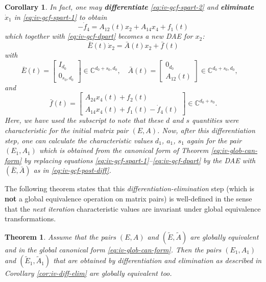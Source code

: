\documentclass[]{book}
\newtheorem{theorem}{Theorem}[chapter]
\newtheorem{corollary}{Corollary}[chapter]
\theoremstyle{definition}
\theoremstyle{definition}
\theoremstyle{definition}
\theoremstyle{definition}
\theoremstyle{remark}
\begin{document}
\begin{corollary}
\protect\hypertarget{cor:iv-diff-elim}{}{\label{cor:iv-diff-elim} }In fact, one may \textbf{differentiate} \eqref{eq:iv-gcf-spart-2} and \textbf{eliminate} \(\dot x_1\) in \eqref{eq:iv-gcf-spart-1} to obtain
\[
-\dot f_4 = A_{12}(t)x_2 + A_{14}x_4 + f_1(t)
\]
which together with \eqref{eq:iv-gcf-dpart} becomes a new DAE for \(x_2\):
\[
\bar E(t) \dot x_2 = \bar A(t) x_2 + \bar f(t)
\]
with
\begin{equation}
\bar E(t) = 
\begin{bmatrix}
I_{d_0} \\ 0_{s_0, d_0} 
\end{bmatrix}\in \mathbb C^{d_0+s_0, d_0}, \quad
\bar A(t) =
\begin{bmatrix}
0_{d_0} \\ A_{12}(t)
\end{bmatrix} \in \mathbb C^{d_0+s_0, d_0}, \quad \label{eq:iv-gcf-post-diff}
\end{equation}
and
\[
\bar f(t) =
\begin{bmatrix}
A_{24}x_4(t) + f_2(t) \\ A_{14}x_4(t)+f_1(t)-\dot f_4(t)
\end{bmatrix} \in \mathbb C^{d_0+s_0}.
\]
Here, we have used the subscript to note that these \(d\) and \(s\) quantities were characteristic for the initial matrix pair \((E, A)\). Now, after this differentiation step, one can calculate the characteristic values \(d_1\), \(a_1\), \(s_1\) again for the pair \((E_1, A_1)\) which is obtained from the canonical form of Theorem \eqref{eq:iv-glob-can-form} by replacing equations \eqref{eq:iv-gcf-spart-1}--\eqref{eq:iv-gcf-dpart} by the DAE with \((\bar E, \bar A)\) as in \eqref{eq:iv-gcf-post-diff}.
\end{corollary}

The following theorem states that this \emph{differentiation-elimination} step
(which is \textbf{not} a global equivalence operation on matrix pairs) is well-defined in the sense that the \emph{next iteration} characteristic values are invariant under global equivalence transformations.

\begin{theorem}
\protect\hypertarget{thm:iv-diff-elim-invariant}{}{\label{thm:iv-diff-elim-invariant} }Assume that the pairs \((E, A)\) and \((\tilde E, \tilde A)\) are globally equivalent and in the global canonical form \eqref{eq:iv-glob-can-form}. Then the pairs \((E_1, A_1)\) and \((\tilde E_1, \tilde A_1)\) that are obtained by differentiation and elimination as described in Corollary \ref{cor:iv-diff-elim} are globally equivalent too.
\end{theorem}
\end{document}
